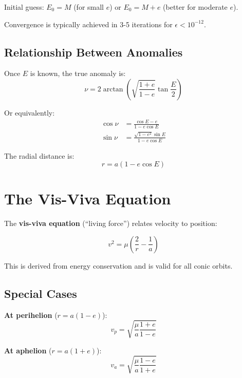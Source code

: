 Initial guess: $E_0 = M$ (for small $e$) or $E_0 = M + e$ (better for moderate $e$).

Convergence is typically achieved in 3-5 iterations for $\epsilon < 10^{-12}$.

\subsection{Relationship Between Anomalies}

Once $E$ is known, the true anomaly is:
\begin{equation}
    \nu = 2\arctan\left(\sqrt{\frac{1+e}{1-e}}\tan\frac{E}{2}\right)
\end{equation}

Or equivalently:
\begin{align}
    \cos\nu &= \frac{\cos E - e}{1 - e\cos E} \\
    \sin\nu &= \frac{\sqrt{1-e^2}\sin E}{1 - e\cos E}
\end{align}

The radial distance is:
\begin{equation}
    r = a(1 - e\cos E)
\end{equation}

\section{The Vis-Viva Equation}

The \textbf{vis-viva equation} (``living force'') relates velocity to position:

\begin{equation}
    v^2 = \mu\left(\frac{2}{r} - \frac{1}{a}\right)
\end{equation}

This is derived from energy conservation and is valid for all conic orbits.

\subsection{Special Cases}

\textbf{At perihelion} ($r = a(1-e)$):
\begin{equation}
    v_p = \sqrt{\frac{\mu}{a}\frac{1+e}{1-e}}
\end{equation}

\textbf{At aphelion} ($r = a(1+e)$):
\begin{equation}
    v_a = \sqrt{\frac{\mu}{a}\frac{1-e}{1+e}}
\end{equation}

